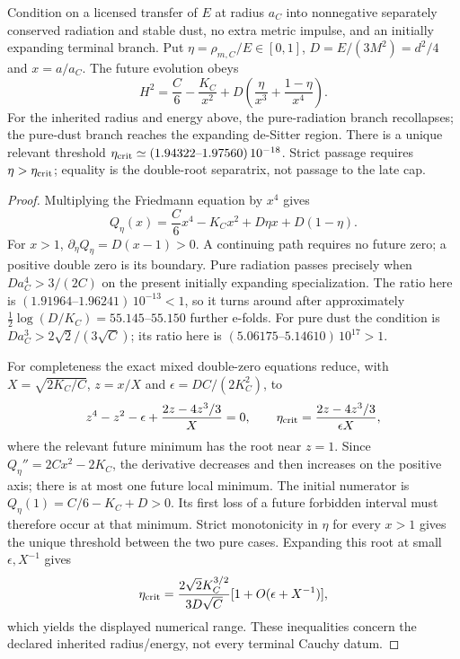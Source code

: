 \documentclass[12pt,a4paper]{article}
\begin{document}
\begin{proposition}
\label{p8:prop:v2216-radiation-dust-target}
Condition on a licensed transfer of $E$ at radius $a_C$ into
nonnegative separately conserved radiation and stable dust, no extra
metric impulse, and an initially expanding terminal branch.  Put
$\eta=\rho_{m,C}/E\in[0,1]$, $D=E/(3M^2)=d^2/4$ and $x=a/a_C$.
The future evolution obeys
\[
 H^2=\frac C6-\frac{K_C}{x^2}
       +D\left(\frac\eta{x^3}+\frac{1-\eta}{x^4}\right).
\]
For the inherited radius and energy above, the pure-radiation branch
recollapses; the pure-dust branch reaches the expanding de-Sitter region.
There is a unique relevant threshold
$\eta_{\rm crit}\simeq(1.94322\text{--}1.97560)\,10^{-18}$.
Strict passage requires $\eta>\eta_{\rm crit}$; equality is the
double-root separatrix, not passage to the late cap.
\end{proposition}
\begin{proof}
Multiplying the Friedmann equation by $x^4$ gives
\[
 Q_\eta(x)=\frac C6x^4-K_Cx^2+D\eta x+D(1-\eta).
\]
For $x>1$, $\partial_\eta Q_\eta=D(x-1)>0$.  A continuing path
requires no future zero; a positive double zero is its boundary.
Pure radiation passes precisely when
$D a_C^4>3/(2C)$ on the present initially expanding specialization.
The ratio here is
$(1.91964\text{--}1.96241)\,10^{-13}<1$, so it turns around after
approximately $\tfrac12\log(D/K_C)=55.145\text{--}55.150$ further
e-folds.  For pure dust the condition is
$D a_C^3>2\sqrt2/(3\sqrt C)$; its ratio here is
$(5.06175\text{--}5.14610)\,10^{17}>1$.

For completeness the exact mixed double-zero equations reduce, with
$X=\sqrt{2K_C/C}$, $z=x/X$ and $\epsilon=DC/(2K_C^2)$, to
\[
 z^4-z^2-\epsilon+\frac{2z-4z^3/3}{X}=0,\qquad
 \eta_{\rm crit}=\frac{2z-4z^3/3}{\epsilon X},
\]
where the relevant future minimum has the root near $z=1$.
Since $Q_\eta''=2Cx^2-2K_C$, the derivative decreases and then
increases on the positive axis; there is at most one future local
minimum.  The initial numerator is $Q_\eta(1)=C/6-K_C+D>0$.
Its first loss of a future forbidden interval must therefore occur at
that minimum.  Strict monotonicity in $\eta$ for every $x>1$ gives
the unique threshold between the two pure cases.  Expanding this root
at small $\epsilon,X^{-1}$ gives
\[
 \eta_{\rm crit}=\frac{2\sqrt2K_C^{3/2}}{3D\sqrt C}
             [1+O(\epsilon+X^{-1})],
\]
which yields the displayed numerical range.  These inequalities concern
the declared inherited radius/energy, not every terminal Cauchy datum.
\end{proof}
\end{document}
